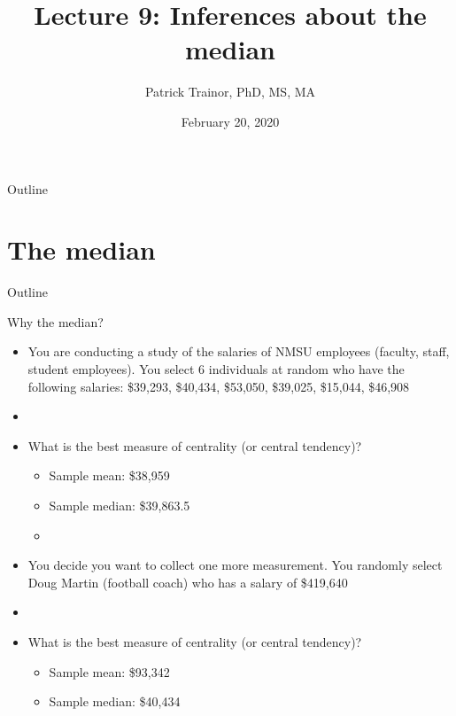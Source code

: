\documentclass[xcolor=dvipsnames]{beamer}
\title[Lecture 9]{Lecture 9: Inferences about the median}
\author[Patrick Trainor]{Patrick Trainor, PhD, MS, MA}
\institute[NMSU]{New Mexico State University}
\date{February 20, 2020}
\begin{document}
\begin{frame}
	\maketitle
\end{frame}

\begin{frame}{Outline}
	\tableofcontents[hideallsubsections]
\end{frame}

\section{The median}
\begin{frame}{Outline}
\tableofcontents[currentsection,subsectionstyle=show/shaded/hide]
\end{frame}

\begin{frame}{Why the median?}
	\begin{itemize}
		\item You are conducting a study of the salaries of NMSU employees (faculty, staff, student employees). You select 6 individuals at random who have the following salaries: \$39,293, \$40,434, \$53,050, \$39,025, \$15,044, \$46,908 \pause
		\item[]
		\item What is the best measure of centrality (or central tendency)? \pause
		\begin{itemize}
			\item Sample mean: \$38,959 \pause
			\item Sample median: \$39,863.5 \pause
			\item[]
		\end{itemize}
	\item You decide you want to collect one more measurement. You randomly select Doug Martin (football coach) who has a salary of \$419,640 \pause
	\item[]
			\item What is the best measure of centrality (or central tendency)? \pause
	\begin{itemize}
		\item Sample mean: \$93,342 \pause
		\item Sample median: \$40,434
	\end{itemize}
	\end{itemize}
\end{frame}
\end{document}
